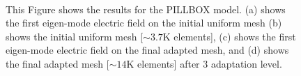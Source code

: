 \documentclass[review,12pt]{elsarticle_summary_report}
\begin{document}
\begin{landscape}
\begin{figure}[ph!]
\centering
{}
\hspace*{50pt}
\\
\hspace*{50pt}
\caption{\label{pill} This Figure shows the results for the PILLBOX model. (a) shows the first eigen-mode electric field on the initial uniform mesh (b) shows the initial uniform mesh [$\sim3.7\text{K}$ elements], (c) shows the first eigen-mode electric field on the final adapted mesh, and (d) shows the final adapted mesh [$\sim14\text{K}$ elements] after 3 adaptation level.}
\end{figure}
\end{landscape}
\end{document}

